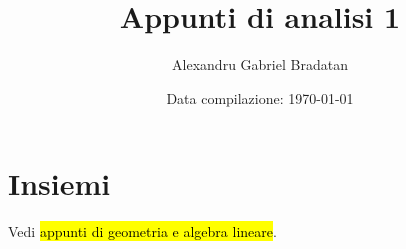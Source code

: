 \documentclass[a4paper,11pt,oneside,dvipsnames]{article}
\title{Appunti di analisi 1}
\author{Alexandru Gabriel Bradatan}
\date{Data compilazione: \today}
\begin{document}
\maketitle
\tableofcontents

\section{Insiemi}
Vedi \hl{appunti di geometria e algebra lineare}.




\end{document}
